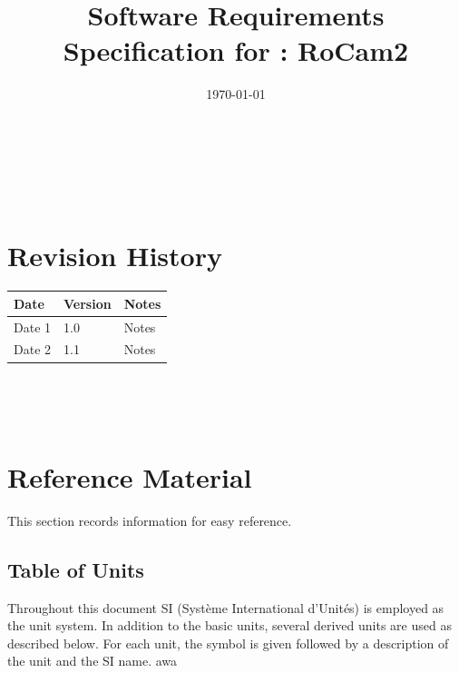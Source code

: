 \documentclass[12pt]{article}
\begin{document}
\title{Software Requirements Specification for \progname: RoCam2}
\author{\authname}
\date{\today}

\maketitle

~\newpage


\tableofcontents

~\newpage

\section*{Revision History}

\begin{tabularx}{\textwidth}{p{3cm}p{2cm}X}
  \toprule {\bf Date} & {\bf Version} & {\bf Notes} \\
  \midrule
  Date 1              & 1.0           & Notes       \\
  Date 2              & 1.1           & Notes       \\
  \bottomrule
\end{tabularx}

~\\

~\newpage

\section{Reference Material}

This section records information for easy reference.

\subsection{Table of Units}

Throughout this document SI (Syst\`{e}me International d'Unit\'{e}s) is
employed as the unit system. In addition to the basic units, several derived
units are used as described below. For each unit, the symbol is given followed
by a description of the unit and the SI name. awa ~\newline
\end{document}
